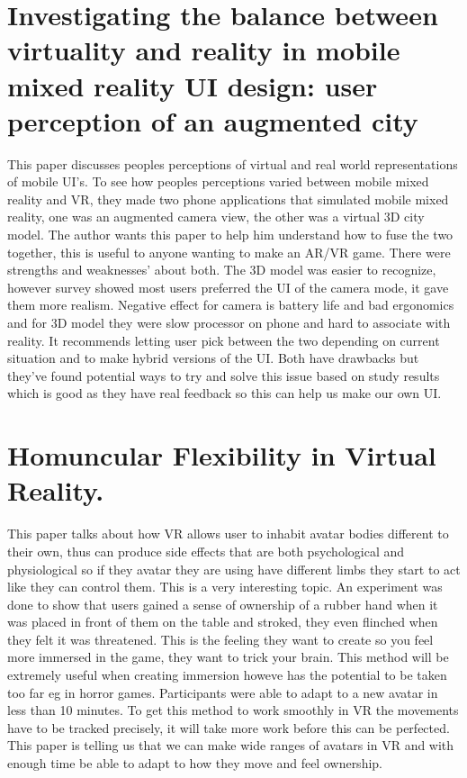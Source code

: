 \documentclass{scrartcl}
\begin{document}
\section{Investigating the balance between virtuality and reality in mobile mixed reality UI design: user perception of an augmented city \cite{venta2014investigating} }
This paper discusses peoples perceptions of virtual and real world representations of mobile UI's. To see how peoples perceptions varied between mobile mixed reality and VR, they made two phone applications that simulated mobile mixed reality, one was an augmented camera view, the other was a virtual 3D city model. The author wants this paper to help him understand how to fuse the two together, this is useful to anyone wanting to make an AR/VR game. There were strengths and weaknesses' about both. The 3D model was easier to recognize, however survey showed most users preferred the UI of the camera mode, it gave them more realism. Negative effect for camera is battery life and bad ergonomics and for 3D model they were slow processor on phone and hard to associate with reality. It recommends letting user pick between the two depending on current situation and to make hybrid versions of the UI. Both have drawbacks but they've found potential ways to try and solve this issue based on study results which is good as they have real feedback so this can help us make our own UI.

\section{Homuncular Flexibility in Virtual Reality.\cite{won2015homuncular} }
This paper talks about how VR allows user to inhabit avatar bodies different to their own, thus can produce side effects that are both psychological and physiological so if they avatar they are using have different limbs they start to act like they can control them. This is a very interesting topic. An experiment was done to show that users gained a sense of ownership of a rubber hand when it was placed in front of them on the table and stroked, they even flinched when they felt it was threatened. This is the feeling they want to create so you feel more immersed in the game, they want to trick your brain. This method will be extremely useful when creating immersion howeve has the potential to be taken too far eg in horror games. Participants were able to adapt to a new avatar in less than 10 minutes. To get this method to work smoothly in VR the movements have to be tracked precisely, it will take more work before this can be perfected. This paper is telling us that we can make wide ranges of avatars in VR and with enough time be able to adapt to how they move and feel ownership.
\end{document}
